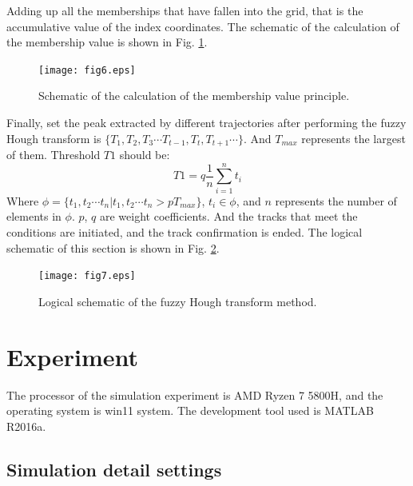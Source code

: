 \documentclass[default,iicol]{sn-jnl}%
\theoremstyle{thmstyleone}%
\theoremstyle{thmstyletwo}%
\theoremstyle{thmstylethree}%
\begin{document}
Adding up all the memberships that have fallen into the grid, that is the accumulative value of the index coordinates. The schematic of the calculation of the membership value is shown in Fig. \ref{fig6}.

\begin{figure}[b]%
    \centering
    \texttt{[image:  fig6.eps]}
    \caption{Schematic of the calculation of the membership value principle.}\label{fig6}
\end{figure}

Finally, set the peak extracted by different trajectories after performing the fuzzy Hough transform is $\{ T _ { 1 } , T _ { 2 } , T _ { 3 } \cdots T _ { t - 1 } , T _ { t } , T _ { t + 1 } \cdots \}$. And $T_{max}$ represents the largest of them. Threshold $T1$ should be:
\begin{equation}\label{eq16}
    T 1 = q \frac { 1 } { n } \sum _ { i = 1 } ^ { n } t _ { i }
\end{equation}
Where $\phi \!=\! \{ t _ { 1 } , t _ { 2 } \cdots t _ { n } \vert t _ { 1 } , t _ { 2 } \cdots t _ { n } \gt p T_{max}\}$, $t _ { i } \in \phi$, and $n$ represents the number of elements in $\phi$. $p$, $q$ are weight coefficients. And the tracks that meet the conditions are initiated, and the track confirmation is ended. The logical schematic of this section is shown in Fig. \ref{fig7}.
\begin{figure}[h]%
    \centering
    \texttt{[image: fig7.eps]}
    \caption{Logical schematic of the fuzzy Hough transform method.}\label{fig7}
\end{figure}
\vspace{-0.3cm}
\section{Experiment}\label{sec3}

The processor of the simulation experiment is AMD Ryzen 7 5800H, and the operating system is win11 system. The development tool used is MATLAB R2016a.

\subsection{Simulation detail settings}\label{subsec5}
\end{document}
